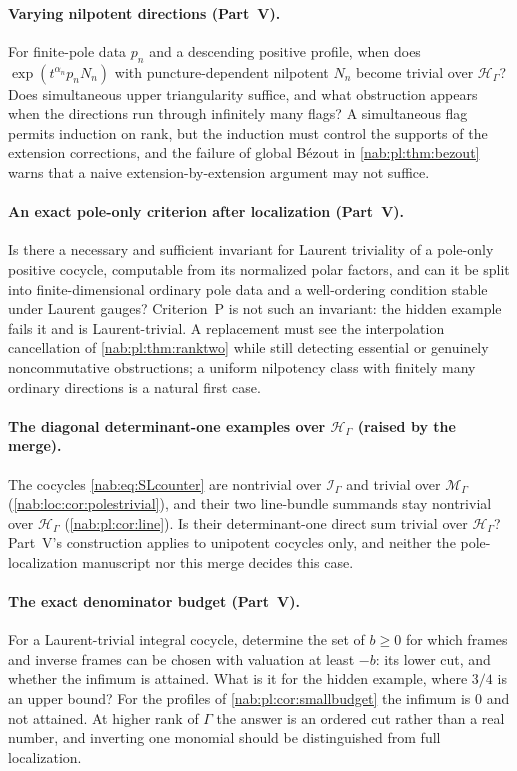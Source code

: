 \documentclass[11pt,letterpaper]{article}
\theoremstyle{definition}
\theoremstyle{remark}
\newcommand{\HH}{\mathscr H_\Gamma}
\newcommand{\II}{\mathscr I_\Gamma}
\newcommand{\MM}{\mathscr M_\Gamma}
\numberwithin{equation}{section}
\begin{document}
\paragraph{Varying nilpotent directions (Part~V).}
For finite-pole data $p_n$ and a descending positive profile, when does
$\exp(t^{\alpha_n}p_nN_n)$ with puncture-dependent nilpotent $N_n$ become
trivial over $\HH$? Does simultaneous upper triangularity suffice, and what
obstruction appears when the directions run through infinitely many flags? A
simultaneous flag permits induction on rank, but the induction must control
the supports of the extension corrections, and the failure of global B\'ezout
in \cref{nab:pl:thm:bezout} warns that a naive extension-by-extension argument
may not suffice.

\paragraph{An exact pole-only criterion after localization (Part~V).}
Is there a necessary and sufficient invariant for Laurent triviality of a
pole-only positive cocycle, computable from its normalized polar factors, and
can it be split into finite-dimensional ordinary pole data and a well-ordering
condition stable under Laurent gauges? Criterion~P is not such an invariant:
the hidden example fails it and is Laurent-trivial. A replacement must see the
interpolation cancellation of \cref{nab:pl:thm:ranktwo} while still detecting
essential or genuinely noncommutative obstructions; a uniform nilpotency class
with finitely many ordinary directions is a natural first case.

\paragraph{The diagonal determinant-one examples over $\HH$ (raised by the
merge).}
The cocycles \eqref{nab:eq:SLcounter} are nontrivial over $\II$ and trivial
over $\MM$ (\cref{nab:loc:cor:polestrivial}), and their two line-bundle
summands stay nontrivial over $\HH$ (\cref{nab:pl:cor:line}). Is their
determinant-one direct sum trivial over $\HH$? Part~V's construction applies to
unipotent cocycles only, and neither the pole-localization manuscript nor this
merge decides this case.

\paragraph{The exact denominator budget (Part~V).}
For a Laurent-trivial integral cocycle, determine the set of $b\geq0$ for which
frames and inverse frames can be chosen with valuation at least $-b$: its lower
cut, and whether the infimum is attained. What is it for the hidden example,
where $3/4$ is an upper bound? For the profiles of
\cref{nab:pl:cor:smallbudget} the infimum is $0$ and not attained. At higher
rank of $\Gamma$ the answer is an ordered cut rather than a real number, and
inverting one monomial should be distinguished from full localization.
\end{document}
